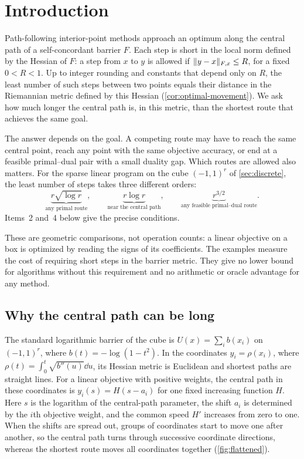 \section{Introduction}
\label{sec:introduction}

Path-following interior-point methods approach an optimum along the
central path of a self-concordant barrier $F$. Each step is short in the
local norm defined by the Hessian of $F$: a step from $x$ to $y$ is
allowed if $\lVert y-x\rVert_{F,x}\leq R$, for a fixed $0<R<1$. Up to integer
rounding and constants that depend only on $R$, the least number of such
steps between two points equals their distance in the Riemannian metric
defined by this Hessian (\cref{cor:optimal-movement}). We ask how much
longer the central path is, in this metric, than the shortest route that
achieves the same goal.

The answer depends on the goal. A competing route may have to reach the
same central point, reach any point with the same objective accuracy, or
end at a feasible primal--dual pair with a small duality gap. Which
routes are allowed also matters. For the sparse linear program on the
cube $(-1,1)^r$ of \cref{sec:discrete}, the least number of
steps takes three different orders:
\[
 \underbrace{r\sqrt{\log r}}_{\text{any primal route}},
 \qquad
 \underbrace{r\log r}_{\text{near the central path}},
 \qquad
 \underbrace{r^{3/2}}_{\text{any feasible primal--dual route}}.
\]
Items~2 and~4 below give the precise conditions.

These are geometric comparisons, not operation counts: a linear
objective on a box is optimized by reading the signs of its
coefficients. The examples measure the cost of requiring short steps in
the barrier metric. They give no lower bound for algorithms without
this requirement and no arithmetic or oracle advantage for any method.

\subsection{Why the central path can be long}

The standard logarithmic barrier of the cube is $U(x)=\sum_i b(x_i)$
on $(-1,1)^r$, where $b(t)=-\log(1-t^2)$. In the coordinates
$y_i=\rho(x_i)$, where $\rho(t)=\int_0^t\sqrt{b''(u)}\dd u$, its
Hessian metric is Euclidean and shortest paths are straight lines. For a linear objective with positive weights, the
central path in these coordinates is $y_i(s)=H(s-a_i)$ for one fixed
increasing function $H$. Here $s$ is the logarithm of the central-path
parameter, the shift $a_i$ is determined by the $i$th objective weight,
and the common speed $H'$ increases from zero to one. When the shifts
are spread out, groups of coordinates start to move one after another,
so the central path turns through successive coordinate
directions, whereas the shortest route moves all coordinates together
(\cref{fig:flattened}).

